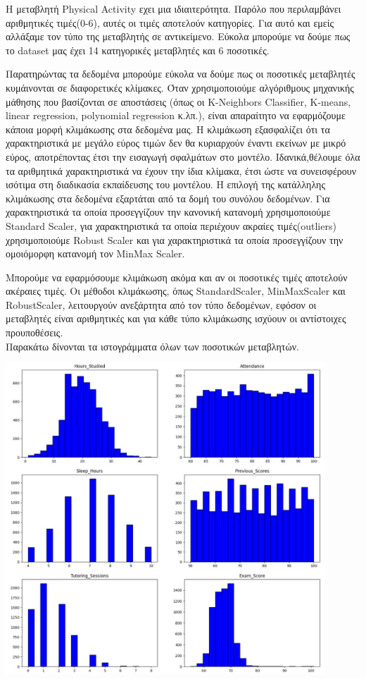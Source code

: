 \documentclass[12pt]{article}
\begin{document}
Η μεταβλητή Physical Activity εχει μια ιδιαιτερότητα. Παρόλο που περιλαμβάνει αριθμητικές τιμές(0-6), αυτές οι τιμές αποτελούν κατηγορίες. Για αυτό και εμείς αλλάξαμε τον τύπο της μεταβλητής σε αντικείμενο. Εύκολα μπορούμε να δούμε πως το dataset μας έχει 14 κατηγορικές μεταβλητές και 6 ποσοτικές.

Παρατηρώντας τα δεδομένα μπορούμε εύκολα να δούμε πως οι ποσοτικές μεταβλητές κυμάινονται σε διαφορετικές κλίμακες. 
Όταν χρησιμοποιούμε αλγόριθμους μηχανικής μάθησης που βασίζονται σε αποστάσεις (όπως οι K-Neighbors Classifier, K-means, linear regression, polynomial regression κ.λπ.), είναι απαραίτητο να εφαρμόζουμε κάποια μορφή κλιμάκωσης στα δεδομένα μας. Η κλιμάκωση εξασφαλίζει ότι τα χαρακτηριστικά με μεγάλο εύρος τιμών δεν θα κυριαρχούν έναντι εκείνων με μικρό εύρος, αποτρέποντας έτσι την εισαγωγή σφαλμάτων στο μοντέλο. Ιδανικά,θέλουμε όλα τα αριθμητικά χαρακτηριστικά να έχουν την ίδια κλίμακα, έτσι ώστε να συνεισφέρουν ισότιμα στη διαδικασία εκπαίδευσης του μοντέλου. Η επιλογή της κατάλληλης κλιμάκωσης στα δεδομένα εξαρτάται από τα δομή του συνόλου δεδομένων. Για χαρακτηριστικά τα οποία προσεγγίζουν την κανονική κατανομή χρησιμοποιούμε Standard Scaler, για χαρακτηριστικά τα οποία περιέχουν ακραίες τιμές(outliers) χρησιμοποιούμε Robust Scaler και για χαρακτηριστικά τα οποία προσεγγίζουν την ομοιόμορφη κατανομή τον MinMax Scaler.

Mπορούμε να εφαρμόσουμε κλιμάκωση ακόμα και αν οι ποσοτικές τιμές αποτελούν ακέραιες τιμές. Οι μέθοδοι κλιμάκωσης, όπως StandardScaler, MinMaxScaler και RobustScaler, λειτουργούν ανεξάρτητα από τον τύπο δεδομένων, εφόσον οι μεταβλητές είναι αριθμητικές και για κάθε τύπο κλιμάκωσης ισχύουν οι αντίστοιχες προυποθέσεις.  
\\

\noindent Παρακάτω δίνονται τα ιστογράμματα όλων των ποσοτικών μεταβλητών.

\begin{center}
    \includegraphics[width=0.9\textwidth]{./images/icon2.jpg}
    
\end{center}
\end{document}
